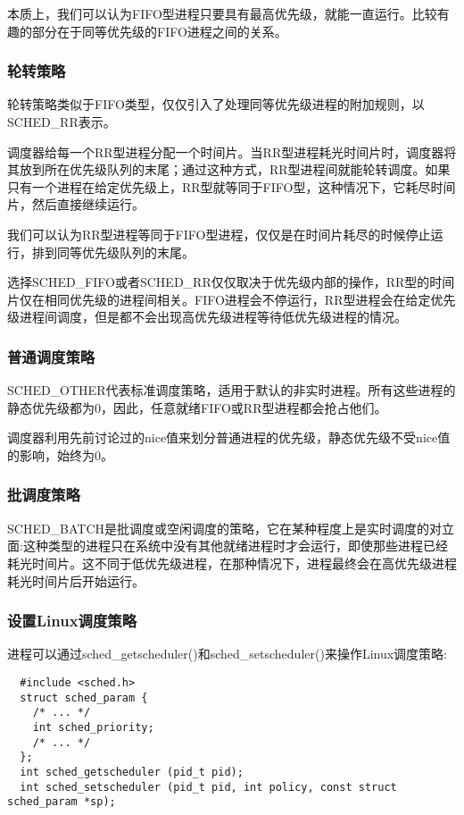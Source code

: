   本质上，我们可以认为FIFO型进程只要具有最高优先级，就能一直运行。比较有趣的部分在于同等优先级的FIFO进程之间的关系。

\subsubsection{轮转策略}

  轮转策略类似于FIFO类型，仅仅引入了处理同等优先级进程的附加规则，以SCHED\_RR表示。

  调度器给每一个RR型进程分配一个时间片。当RR型进程耗光时间片时，调度器将其放到所在优先级队列的末尾；通过这种方式，RR型进程间就能轮转调度。如果只有一个进程在给定优先级上，RR型就等同于FIFO型，这种情况下，它耗尽时间片，然后直接继续运行。

  我们可以认为RR型进程等同于FIFO型进程，仅仅是在时间片耗尽的时候停止运行，排到同等优先级队列的末尾。

  选择SCHED\_FIFO或者SCHED\_RR仅仅取决于优先级内部的操作，RR型的时间片仅在相同优先级的进程间相关。FIFO进程会不停运行，RR型进程会在给定优先级进程间调度，但是都不会出现高优先级进程等待低优先级进程的情况。

\subsubsection{普通调度策略}

  SCHED\_OTHER代表标准调度策略，适用于默认的非实时进程。所有这些进程的静态优先级都为0，因此，任意就绪FIFO或RR型进程都会抢占他们。

  调度器利用先前讨论过的nice值来划分普通进程的优先级，静态优先级不受nice值的影响，始终为0。

\subsubsection{批调度策略}

  SCHED\_BATCH是批调度或空闲调度的策略，它在某种程度上是实时调度的对立面:这种类型的进程只在系统中没有其他就绪进程时才会运行，即使那些进程已经耗光时间片。这不同于低优先级进程，在那种情况下，进程最终会在高优先级进程耗光时间片后开始运行。

\subsubsection{设置Linux调度策略}

  进程可以通过sched\_getscheduler()和sched\_setscheduler()来操作Linux调度策略:

\begin{lstlisting}
  #include <sched.h>
  struct sched_param {
    /* ... */
    int sched_priority;
    /* ... */
  };
  int sched_getscheduler (pid_t pid);
  int sched_setscheduler (pid_t pid, int policy, const struct sched_param *sp);
\end{lstlisting}

